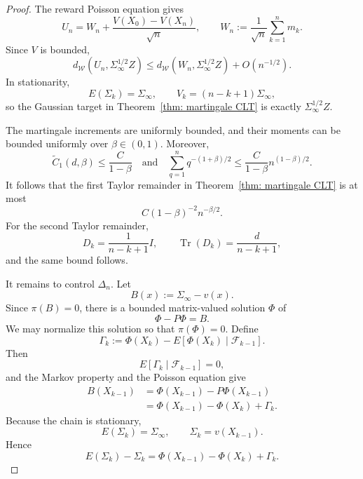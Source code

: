 \documentclass[11pt]{article}
\begin{document}
\begin{proof}
The reward Poisson equation gives
\[
U_n=W_n+\frac{V(X_0)-V(X_n)}{\sqrt n},
\qquad
W_n:=\frac1{\sqrt n}\sum_{k=1}^n m_k.
\]
Since $V$ is bounded,
\[
d_{\mathcal W}(U_n,\Sigma_\infty^{1/2}Z)
\leq
d_{\mathcal W}(W_n,\Sigma_\infty^{1/2}Z)+O(n^{-1/2}).
\]
In stationarity,
\[
E(\Sigma_k)=\Sigma_\infty,
\qquad
V_k=(n-k+1)\Sigma_\infty,
\]
so the Gaussian target in Theorem~\ref{thm: martingale CLT} is exactly
$\Sigma_\infty^{1/2}Z$.

The martingale increments are uniformly bounded, and their moments can be
bounded uniformly over $\beta\in(0,1)$. Moreover,
\[
\tilde C_1(d,\beta)\leq \frac{C}{1-\beta}
\quad\text{and}\quad
\sum_{q=1}^n q^{-(1+\beta)/2}
\leq \frac{C}{1-\beta}n^{(1-\beta)/2}.
\]
It follows that the first Taylor remainder in
Theorem~\ref{thm: martingale CLT} is at most
\[
C(1-\beta)^{-2}n^{-\beta/2}.
\]
For the second Taylor remainder,
\[
D_k=\frac1{n-k+1}I,
\qquad
\operatorname{Tr}(D_k)=\frac{d}{n-k+1},
\]
and the same bound follows.

It remains to control $\Delta_n$. Let
\[
B(x):=\Sigma_\infty-v(x).
\]
Since $\pi(B)=0$, there is a bounded matrix-valued solution $\Phi$ of
\[
\Phi-P\Phi=B.
\]
We may normalize this solution so that $\pi(\Phi)=0$. Define
\[
\Gamma_k
:=
\Phi(X_k)-E[\Phi(X_k)\mid\mathcal F_{k-1}].
\]
Then
\[
E[\Gamma_k\mid\mathcal F_{k-1}]=0,
\]
and the Markov property and the Poisson equation give
\begin{align*}
B(X_{k-1})
&=
\Phi(X_{k-1})-P\Phi(X_{k-1})
\\
&=
\Phi(X_{k-1})-\Phi(X_k)+\Gamma_k.
\end{align*}
Because the chain is stationary,
\[
E(\Sigma_k)=\Sigma_\infty,
\qquad
\Sigma_k=v(X_{k-1}).
\]
Hence
\begin{equation}
\label{eq: stationary_covariance_poisson_decomposition}
E(\Sigma_k)-\Sigma_k
=
\Phi(X_{k-1})-\Phi(X_k)+\Gamma_k.
\end{equation}


\end{proof}
\end{document}
